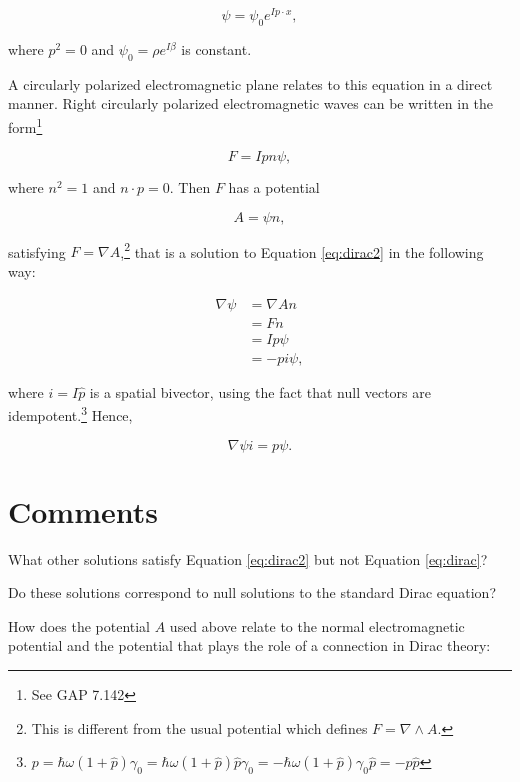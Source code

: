 \documentclass{article}
\begin{document}
  \begin{equation}
    \psi = \psi_0 e^{I p \cdot x}, \label{eq:null}
  \end{equation}

  where $p^2 = 0$ and $\psi_0 = \rho e^{I \beta}$ is constant. 

  A circularly polarized electromagnetic plane relates to this equation in a direct manner. Right circularly polarized electromagnetic waves can be written in the form\footnote{See GAP 7.142}

  \begin{equation}
    F = I p n \psi,
  \end{equation}

  where $n^2 = 1$ and $n \cdot p = 0$. Then $F$ has a potential

  \begin{equation}
    A = \psi n,
  \end{equation}

  satisfying $F = \nabla A$,\footnote{This is different from the usual potential which defines $F = \nabla \wedge A$.} that is a solution to Equation \ref{eq:dirac2} in the following way:

  \begin{align}
    \nabla \psi &= \nabla A n \\
                &= F n \\
                &= I p \psi \\
                &= -p i \psi,
  \end{align}
  
  where $i = I \hat{p}$ is a spatial bivector, using the fact that null vectors are idempotent.\footnote{$p = \hbar \omega (1 + \hat p )\gamma_0 = \hbar \omega (1 + \hat p) \hat p \gamma_0 = - \hbar \omega (1 + \hat p) \gamma_0 \hat p = - p \hat p$} Hence,
  
  \begin{equation}
      \nabla \psi i = p \psi.
  \end{equation}

  \section{Comments}
  
  What other solutions satisfy Equation \ref{eq:dirac2} but not Equation \ref{eq:dirac}?
  
  Do these solutions correspond to null solutions to the standard Dirac equation?
  
  How does the potential $A$ used above relate to the normal electromagnetic potential and the potential that plays the role of a connection in Dirac theory:
\end{document}
